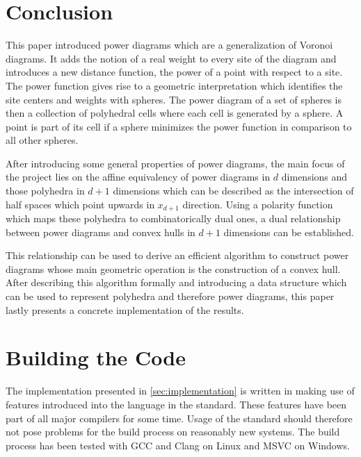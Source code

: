 \section{Conclusion}
\label{sec:conclusion}
This paper introduced power diagrams which are a generalization of Voronoi diagrams.
It adds the notion of a real weight to every site of the diagram and introduces a new distance function, the power of a point with respect to a site.
The power function gives rise to a geometric interpretation which identifies the site centers and weights with spheres.
The power diagram of a set of spheres is then a collection of polyhedral cells where each cell is generated by a sphere.
A point is part of its cell if a sphere minimizes the power function in comparison to all other spheres.

After introducing some general properties of power diagrams, the main focus of the project lies on the affine equivalency of power diagrams in $d$ dimensions and those polyhedra in $d+1$ dimensions which can be described as the intersection of half spaces which point upwards in $x_{d+1}$ direction.
Using a polarity function which maps these polyhedra to combinatorically dual ones, a dual relationship between power diagrams and convex hulls in $d+1$ dimensions can be established.

This relationship can be used to derive an efficient algorithm to construct power diagrams whose main geometric operation is the construction of a convex hull.
After describing this algorithm formally and introducing a data structure which can be used to represent polyhedra and therefore power diagrams, this paper lastly presents a concrete implementation of the results.

\appendix
\section{Building the Code}
\label{sec:building_the_code}
The implementation presented in \cref{sec:implementation} is written in \CC making use of features introduced into the language in the \CCe standard.
These features have been part of all major \CC compilers for some time.
Usage of the standard should therefore not pose problems for the build process on reasonably new systems.
The build process has been tested with GCC and Clang on Linux and MSVC on Windows.

